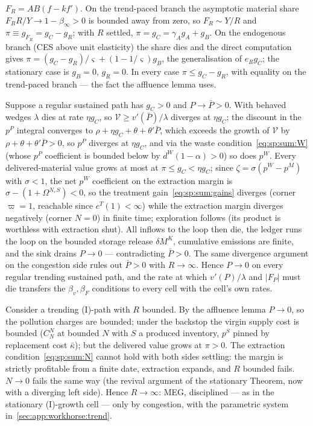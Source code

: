  $F_R=AB\left(f-kf'\right)$. On the trend-paced branch
the asymptotic material share $F_RR/Y\to1-\beta_\infty>0$ is bounded away from zero, so
$F_R\sim Y/R$ and $\pi\equiv g_{F_R}=g_C-g_R$; with $R$ settled, $\pi=g_C=\gamma_Ag_A+g_B$.
On the endogenous branch (CES above unit elasticity) the share dies and the direct
computation gives
$\pi=\left(g_C-g_R\right)/\varsigma+\left(1-1/\varsigma\right)g_B$, the
generalisation of $e_Rg_C$; the stationary case is $g_B=0$, $g_R=0$. In every case
$\pi\le g_C-g_R$, with equality on the trend-paced branch --- the fact the affluence lemma
uses.

 Suppose a regular
sustained path has $g_C>0$ and $P\to\bar P>0$. With behaved wedges $\lambda$ dies at rate
$\eta g_C$, so $\mathcal V\ge v'\left(\bar P\right)/\lambda$ diverges at $\eta g_C$; the
discount in the $p^P$ integral converges to $\rho+\eta g_C+\theta+\theta'\bar P$, which
exceeds the growth of $\mathcal V$ by $\rho+\theta+\theta'\bar P>0$, so $p^P$ diverges at
$\eta g_C$, and via the waste condition~\eqref{eq:sp:sum:W} (whose $p^P$ coefficient is
bounded below by $d^W\left(1-\alpha\right)>0$) so does $p^W$. Every delivered-material value
grows at most at $\pi\le g_C<\eta g_C$; since
$\zeta=\sigma\left(p^W-p^M\right)$ with $\sigma<1$, the net $p^W$ coefficient on the
extraction margin is $\sigma-\left(1+\Omega^{N,S}\right)<0$, so the treatment
gain~\eqref{eq:sp:sum:gains} diverges (corner $\varpi=1$, reachable since
$c^T\left(1\right)<\infty$) while the extraction margin diverges negatively (corner $N=0$)
in finite time; exploration follows (its product is worthless with extraction shut). All
inflows to the loop then die, the ledger runs the loop on the bounded storage release
$\delta M^K$, cumulative emissions are finite, and the sink drains $P\to0$ ---
contradicting $\bar P>0$. The same divergence argument on the congestion side rules out
$\bar P>0$ with $R\to\infty$. Hence $P\to0$ on every regular trending sustained path, and
the rate at which $v'\left(P\right)/\lambda$ and $\left|F_P\right|$ must die transfers the
$\beta_v,\beta_F$ conditions to every cell with the cell's own rates.

 Consider a trending (I)-path with $R$
bounded. By the affluence lemma $P\to0$, so the pollution charges are bounded; under the
backstop the virgin supply cost is bounded ($C^N_N$ at bounded $N$ with $S$ a produced
inventory, $p^S$ pinned by replacement cost $\bar\kappa$); but the delivered value grows at
$\pi>0$. The extraction condition~\eqref{eq:sp:sum:N} cannot hold with both sides settling:
the margin is strictly profitable from a finite date, extraction expands, and $R$ bounded
fails. $N\to0$ fails the same way (the revival argument of the stationary Theorem, now with
a diverging left side). Hence $R\to\infty$: MEG, disciplined --- as in the stationary
(I)-growth cell --- only by congestion, with the parametric system
in~\ref{sec:app:workhorse:trend}.

